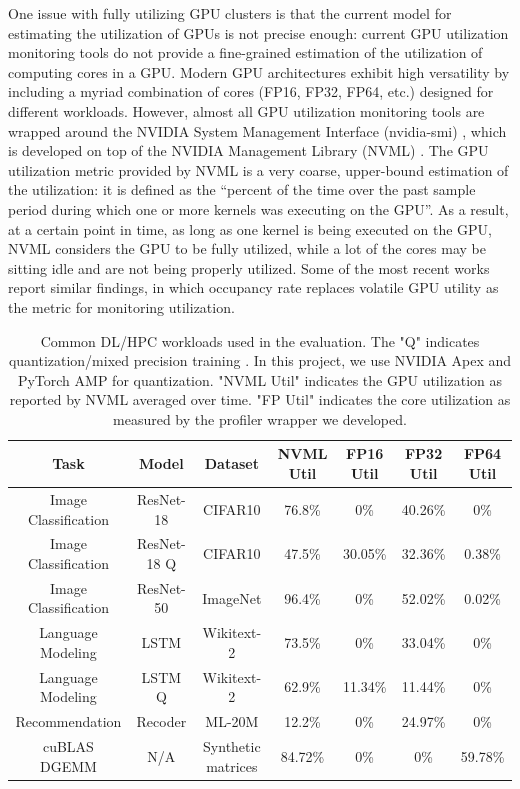 \documentclass{article}
\begin{document}
One issue with fully utilizing GPU clusters is that the current model for estimating the utilization of GPUs is not precise enough: current GPU utilization monitoring tools do not provide a fine-grained estimation of the utilization of computing cores in a GPU. Modern GPU architectures exhibit high versatility by including a myriad combination of cores (FP16, FP32, FP64, etc.) designed for different workloads. However, almost all GPU utilization monitoring tools are wrapped around the NVIDIA System Management Interface (nvidia-smi) \cite{nvidia-smi}, which is developed on top of the NVIDIA Management Library (NVML) \cite{nvml}. The GPU utilization metric provided by NVML is a very coarse, upper-bound estimation of the utilization: it is defined as the “percent of the time over the past sample period during which one or more kernels was executing on the GPU”. As a result, at a certain point in time, as long as one kernel is being executed on the GPU, NVML considers the GPU to be fully utilized, while a lot of the cores may be sitting idle and are not being properly utilized. Some of the most recent works \cite{wavelet} report similar findings, in which occupancy rate replaces volatile GPU utility as the metric for monitoring utilization.


\begin{table}[t]
\label{common-workloads}
\vskip 0.15in
\begin{center}
\begin{tabular*}{\textwidth}{@{\extracolsep{\fill}}|ccc|c|ccc|}
\toprule
Task & Model & Dataset & NVML Util & FP16 Util & FP32 Util & FP64 Util \\
\midrule
Image Classification & ResNet-18 & CIFAR10 & 76.8\% & 0\% & 40.26\% & 0\% \\
Image Classification & ResNet-18 Q & CIFAR10 & 47.5\% & 30.05\% & 32.36\% & 0.38\% \\
Image Classification & ResNet-50 & ImageNet & 96.4\% & 0\% & 52.02\% & 0.02\% \\
Language Modeling & LSTM & Wikitext-2 & 73.5\% & 0\% & 33.04\% & 0\% \\
Language Modeling & LSTM Q & Wikitext-2 & 62.9\% & 11.34\% & 11.44\% & 0\% \\
Recommendation & Recoder & ML-20M & 12.2\% & 0\% & 24.97\% & 0\% \\
cuBLAS DGEMM & N/A & Synthetic matrices & 84.72\% & 0\% & 0\% & 59.78\% \\  %
\bottomrule
\end{tabular*}
\end{center}
\caption{Common DL/HPC workloads used in the evaluation. The "Q" indicates quantization/mixed precision training \cite{mixed_precision}. In this project, we use NVIDIA Apex \cite{apex} and PyTorch AMP \cite{amp} for quantization. "NVML Util" indicates the GPU utilization as reported by NVML averaged over time. "FP Util" indicates the core utilization as measured by the profiler wrapper we developed.}
\vskip -0.1in
\end{table}
\end{document}
